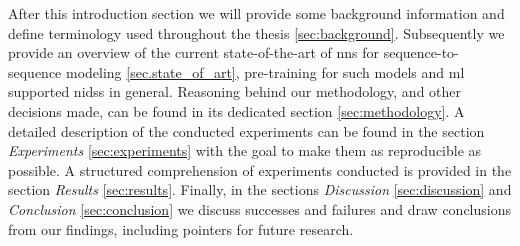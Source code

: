 After this introduction section we will provide some background information and define terminology used throughout the thesis \ref{sec:background}. Subsequently we provide an overview of the current state-of-the-art of \glspl{nn} for sequence-to-sequence modeling \ref{sec.state_of_art}, pre-training for such models and \gls{ml} supported \glspl{nids} in general. Reasoning behind our methodology, and other decisions made, can be found in its dedicated section \ref{sec:methodology}. A detailed description of the conducted experiments can 
be found in the section \textit{Experiments} \ref{sec:experiments} with the goal to make them as reproducible as possible. A structured comprehension of experiments conducted is provided in the section \textit{Results} \ref{sec:results}. Finally, in the sections \textit{Discussion} \ref{sec:discussion} and \textit{Conclusion} \ref{sec:conclusion} we discuss successes and failures and draw conclusions from our findings, including pointers for future research. 


\newpage